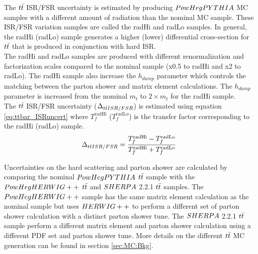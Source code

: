 
\indent  The $t\bar{t}$ ISR/FSR uncertainty is estimated by producing $PowHegPYTHIA$ MC samples with a different amount of radiation than the nominal MC sample.  These ISR/FSR variation samples are called the radHi and radLo samples.  In general, the radHi (radLo) sample generates a higher (lower) differential cross-section for $t\bar{t}$ that is produced in conjunction with hard ISR. \\

\indent The radHi and radLo samples are produced with different renormalization and factorization scales compared to the nominal sample (x0.5 to radHi and x2 to radLo).   The radHi sample also increase the $h_{damp}$ parameter which controls the matching between the parton shower and matrix element calculations.  The $h_{damp}$ parameter is increased from the nominal $m_{t}$ to $2 \times m_{t}$ for the radHi sample.   \\

\indent The $t\bar{t}$ ISR/FSR uncertainty ($ \Delta_{t\bar{t} ISR/FSR} $) is estimated using equation \ref{eq:ttbar_ISRuncert} where $T_f^{\mathrm{radHi}}$ ($T_f^{\mathrm{radLo}}$) is the transfer factor corresponding to the radHi (radLo) sample. \\

\begin{eqnarray}
    \Delta_{t\bar{t} ISR/FSR} = \frac{T_f^{\mathrm{radHi}} - T_f^{\mathrm{radLo}}}{T_f^{\mathrm{radHi}} + T_f^{\mathrm{radLo}}}
    \label{eq:ttbar_ISRuncert}
\end{eqnarray}


\indent Uncertainties on the hard scattering and parton shower are calculated by comparing the nominal $PowHegPYTHIA$ $t\bar{t}$ sample with the $PowHegHERWIG++$ $t\bar{t}$ and $SHERPA$ 2.2.1 $t\bar{t}$ samples.  The $PowHegHERWIG++$ sample has the same matrix element calculation as the nominal sample but uses $HERWIG++$ to perform a different set of parton shower calculation with a distinct parton shower tune.  The $SHERPA$ 2.2.1 $t\bar{t}$ sample perform a different matrix element and parton shower calculation using a different PDF set and parton shower tune.  More details on the different $t\bar{t}$ MC generation can be found in section \ref{sec:MC:Bkg}. \\

